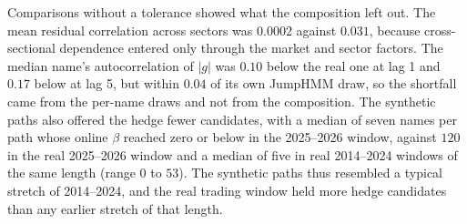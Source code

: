 Comparisons without a tolerance showed what the composition left out. The mean residual correlation across sectors
was $0.0002$ against $0.031$, because cross-sectional dependence entered only through the market and sector factors.
The median name's autocorrelation of $|g|$ was $0.10$ below the real one at lag 1 and $0.17$ below at lag 5, but
within $0.04$ of its own JumpHMM draw, so the shortfall came from the per-name draws and not from the composition.
The synthetic paths also offered the hedge fewer candidates, with a median of seven names per path whose online
$\beta$ reached zero or below in the 2025--2026 window, against $120$ in the real 2025--2026 window and a median of
five in real 2014--2024 windows of the same length (range $0$ to $53$). The synthetic paths thus resembled a typical
stretch of 2014--2024, and the real trading window held more hedge candidates than any earlier stretch of that
length.

